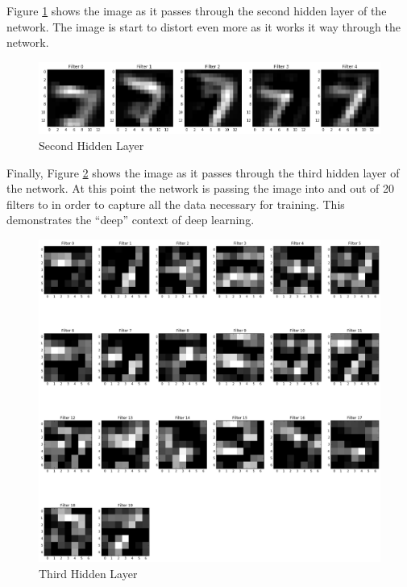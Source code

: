 \documentclass[conference,final,]{IEEEtran}
\begin{document}
Figure \ref{fig:hl2} shows the image as it passes through the second
hidden layer of the network. The image is start to distort even more as
it works it way through the network.\\

\begin{figure}
  \includegraphics[width=\linewidth]{../images/hl2.png}
  \caption{Second Hidden Layer}
  \label{fig:hl2}
\end{figure}

Finally, Figure \ref{fig:hl3} shows the image as it passes through the
third hidden layer of the network. At this point the network is passing
the image into and out of 20 filters to in order to capture all the data
necessary for training. This demonstrates the ``deep'' context of deep
learning.\\

\begin{figure}
  \includegraphics[width=\linewidth]{../images/hl3.png}
  \caption{Third Hidden Layer}
  \label{fig:hl3}
\end{figure}
\end{document}
